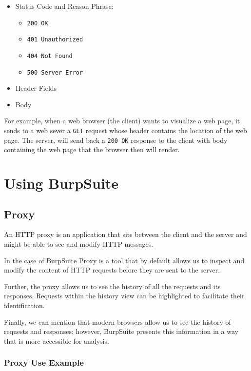 \documentclass[twocolumn]{article}
\begin{document}
\begin{itemize}
    \item Status Code and Reason Phrase:
    \begin{itemize}
        \item \texttt{200 OK}
        \item \texttt{401 Unauthorized}
        \item \texttt{404 Not Found}
        \item \texttt{500 Server Error}
    \end{itemize}
    \item Header Fields
    \item Body
\end{itemize}

For example, when a web browser (the client) wants to visualize a web page, it sends to a web sever a \texttt{GET} request whose header contains the location of the web page. The server, will send back a \texttt{200 OK} response to the client with body containing the web page that the browser then will render.

\section{Using BurpSuite}

\subsection{Proxy}

An HTTP proxy is an application that sits between the client and the server and might be able to see and modify HTTP messages. 

In the case of BurpSuite Proxy is a tool that by default allows us to inspect and modify the content of HTTP requests before they are sent to the server. 

Further, the proxy allows us to see the history of all the requests and its responses. Requests within the history view can be highlighted to facilitate their identification.

Finally, we can mention that modern browsers allow us to see the history of requests and responses; however, BurpSuite presents this information in a way that is more accessible for analysis.

\subsubsection{Proxy Use Example}
\end{document}
